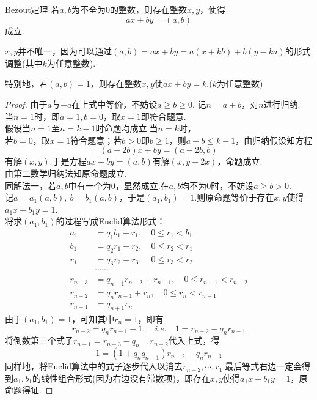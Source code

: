 \begin{theorem}{Bezout定理}
	若$a,b$为不全为$0$的整数，则存在整数$x,y$，使得$$ax+by=(a,b)$$成立.
\end{theorem}
\begin{remark}
	$x,y$并不唯一，因为可以通过$(a,b)=ax+by=a(x+kb)+b(y-ka)$的形式调整(其中$k$为任意整数).
\end{remark}
\begin{remark}
	特别地，若$(a,b)=1$，则存在整数$x,y$使$ax+by=k$.($k$为任意整数)
\end{remark}
\begin{proof} %
	由于$a$与$-a$在上式中等价，不妨设$a \geq b \geq 0$. 记$n=a+b$，对$n$进行归纳. \\
	当$n=1$时，即$a=1,b=0$，取$x=1$即符合题意. \\
	假设当$n=1$至$n=k-1$时命题均成立.当$n=k$时， \\
	若$b=0$，取$x=1$符合题意；若$b > 0$即$b \geq 1$，则$a-b \leq k-1$，由归纳假设知方程$$(a-2b)x+by=(a-2b,b)$$
	有解$(x,y)$.于是方程$ax+by=(a,b)$有解$(x,y-2x)$，命题成立. \\
	由第二数学归纳法知原命题成立. \\
	同解法一，若$a,b$中有一个为$0$，显然成立.在$a,b$均不为$0$时，不妨设$a \geq b >0$. \\
	记$a=a_1(a,b),~b=b_1(a,b)$，于是$(a_1,b_1)=1$.则原命题等价于存在$x,y$使得$a_1x+b_1y=1$. \\
	将求$(a_1,b_1)$的过程写成Euclid算法形式：
	\begin{align*}
		a_1 &= q_1b_1+r_1, \quad 0 \leq r_1 < b_1 \\
		b_1 &= q_2r_1+r_2, \quad 0 \leq r_2 < r_1 \\
		r_1 &= q_3r_2+r_3, \quad 0 \leq r_3 < r_2 \\
		& \cdots \cdots \\
		r_{n-3} &= q_{n-1}r_{n-2} + r_{n-1}, \quad 0 \leq r_{n-1} < r_{n-2} \\
		r_{n-2} &= q_nr_{n-1} + r_n, \quad 0 \leq r_n < r_{n-1} \\
		r_{n-1} &= q_{n+1}r_n
	\end{align*}
	由于$(a_1,b_1)=1$，可知其中$r_n=1$，即有$$r_{n-2} = q_nr_{n-1} + 1,\quad i.e. \quad 1=r_{n-2} - q_nr_{n-1}$$
	将倒数第三个式子$r_{n-1} = r_{n-3} - q_{n-1}r_{n-2}$代入上式，得$$1 = (1+q_nq_{n-1})r_{n-2} - q_nr_{n-3}$$
	同样地，将Euclid算法中的式子逐步代入以消去$r_{n-2},\cdots ,r_1$.最后等式右边一定会得到$a_1,b_1$的线性组合形式(因为右边没有常数项)，即存在$x,y$使得$a_1x+b_1y=1$，原命题得证.
\end{proof}


